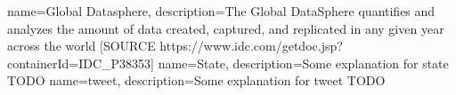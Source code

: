  {
   name=Global Datasphere,
   description={The Global DataSphere quantifies and analyzes the amount of data created, captured, and replicated in any given year across the world [SOURCE https://www.idc.com/getdoc.jsp?containerId=IDC_P38353]}
}
 {
   name=State,
   description={Some explanation for state TODO}
}
 {
   name=tweet,
   description={Some explanation for tweet TODO}
}

